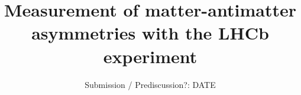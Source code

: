 

\title{Measurement of matter-antimatter asymmetries with the LHCb experiment}
\date{%
  Submission / Prediscussion?: DATE
}



\maketitle
\thispagestyle{empty}
\tableofcontents
\newpage






\printbibliography{}

\appendix
\newpage
%



